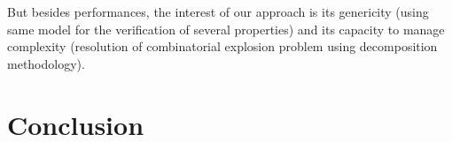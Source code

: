\documentclass[preprint,3p,times,twocolumn]{elsarticle}
\begin{document}




But besides performances, the interest of our approach is its genericity (using same model for the verification of several properties) and its capacity to manage complexity (resolution of combinatorial explosion problem using decomposition methodology). %



\section{Conclusion} 
\end{document}
